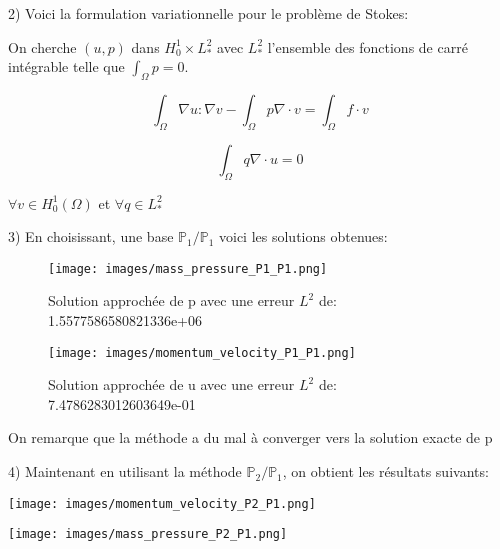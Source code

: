\documentclass{article}
\begin{document}
2) Voici la formulation variationnelle pour le problème de Stokes:

On cherche $(u,p)$ dans $H^1_0 \times L^2_*$ avec $L^2_*$ l'ensemble des fonctions de carré intégrable telle que $\int_{\Omega} p = 0$.

$$\int_{\Omega} \nabla u:\nabla v - \int_{\Omega} p \nabla \cdot v = \int_{\Omega} f \cdot v $$

$$\int_{\Omega}q \nabla \cdot u = 0 $$

$\forall v \in H^1_0(\Omega)$ et $\forall q \in L^2_*$

3) En choisissant, une base $\mathbb{P}_1/\mathbb{P}_1$ voici les solutions obtenues:

\begin{figure}[h]
    \centering
    \texttt{[image: images/mass\_pressure\_P1\_P1.png]}
    \caption{Solution approchée de p avec une erreur $L^2$ de: 1.5577586580821336e+06}
\end{figure}

\begin{figure}[h]
    \centering
    \texttt{[image: images/momentum\_velocity\_P1\_P1.png]}
    \caption{Solution approchée de u avec une erreur $L^2$ de: 7.4786283012603649e-01}
\end{figure}

On remarque que la méthode a du mal à converger vers la solution exacte de p

4) Maintenant en utilisant la méthode $\mathbb{P}_2/\mathbb{P}_1$, on obtient les résultats suivants:

\texttt{[image: images/momentum\_velocity\_P2\_P1.png]}

\texttt{[image: images/mass\_pressure\_P2\_P1.png]}
\end{document}
